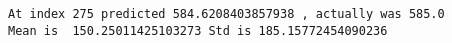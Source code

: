 \documentclass[11pt]{article}
\begin{document}
    \begin{Verbatim}[commandchars=\\\{\}]
At index 275 predicted 584.6208403857938 , actually was 585.0
Mean is  150.25011425103273 Std is 185.15772454090236

    \end{Verbatim}

    \begin{center}
    \end{center}
    { \hspace*{\fill} \\}
    

    
    
    
    
\end{document}
